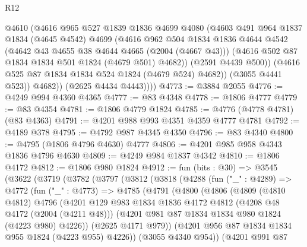 \begin{lexlean}{R12}
\begin{coremodule}
                @4610
                (@4616
                  @965
                  @527
                  @1839
                  @1836
                  @4699
                  @4080
                  (@4603
                    @491
                    @964
                    @1837
                    @1834
                    (@4645 @4542)
                    @4699
                    (@4616
                      @962
                      @504
                      @1834
                      @1836
                      @4644
                      @4542
                      (@4642 @43 @4655 @38 @4644 @4665 (@2004 (@4667 @43)))
                      (@4616 @502 @87 @1834 @1834 @501 @1824 (@4679 @501) @4682))
                    (@2591 @4439 @500))
                  (@4616 @525 @87 @1834 @1834 @524 @1824 (@4679 @524) @4682))
                (@3055 @4441 @523))
              @4682))
          (@2625 @4434 @4443))))
@4773 := @3884 @2055
@4776 := @4249 @994 @4360 @4365
@4777 := @83 @4348
@4778 := @1806 @4777
@4779 := @83 @4354
@4781 := @1806 @4779 @1824
@4785 := @4776 (@4778 @4781) (@83 @4363)
@4791 := @4201 @988 @993 @4351 @4359 @4777 @4781
@4792 := @4189 @378
@4795 := @4792 @987 @4345 @4350
@4796 := @83 @4340
@4800 := @4795 (@1806 @4796 @4630) @4777
@4806 := @4201 @985 @958 @4343 @1836 @4796 @4630
@4809 := @4249 @984 @1837 @4342
@4810 := @1806 @4172
@4812 := @1806 @980 @1824
@4912 := fun (bits : @30) =>
  @3545
    (@3622
      (@3719
        (@3782
          (@3797
            (@3812
              (@3818
                (@4288
                  (fun ("_" : @4289) =>
                  @4772
                    (fun ("_" : @4773) =>
                    @4785
                      (@4791
                        (@4800
                          (@4806
                            (@4809
                              (@4810 @4812)
                              @4796
                              (@4201
                                @129
                                @983
                                @1834
                                @1836
                                @4172
                                @4812
                                (@4208 @48 @4172 (@2004 (@4211 @48)))
                                (@4201 @981 @87 @1834 @1834 @980 @1824 (@4223 @980) @4226))
                              (@2625 @4171 @979))
                            (@4201 @956 @87 @1834 @1834 @955 @1824 (@4223 @955) @4226))
                          (@3055 @4340 @954))
                        (@4201
                          @991
                          @87

\end{coremodule}
\end{lexlean}
